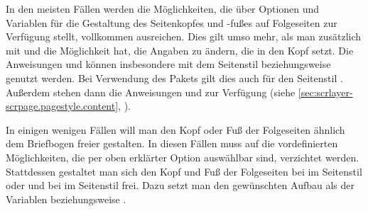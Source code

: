 \begin{Declaration}
\end{Declaration}
In den meisten Fällen werden die Möglichkeiten, die \KOMAScript{} über
Optionen und Variablen für die Gestaltung des Seitenkopfes und
-fußes auf Folgeseiten zur Verfügung stellt,
vollkommen ausreichen.  Dies gilt umso mehr, als man zusätzlich mit
 und  die Möglichkeit hat, die Angaben zu
ändern, die \KOMAScript{} in den Kopf setzt.  Die Anweisungen
 und 
können insbesondere mit dem Seitenstil
%
 beziehungsweise
 genutzt
werden. Bei Verwendung des Pakets%
\hyperref[cha:scrlayer-scrpage]{}%
gilt dies auch für den
Seitenstil %
.  Außerdem stehen dann die Anweisungen
%
 und
%
 zur Verfügung (siehe
\autoref{sec:scrlayer-scrpage.pagestyle.content},
).

\begin{Declaration}
\end{Declaration}
In einigen wenigen Fällen will man den Kopf oder Fuß der Folgeseiten ähnlich
dem Briefbogen freier gestalten. In diesen Fällen muss auf
die vordefinierten Möglichkeiten, die per oben erklärter Option
 auswählbar
sind, verzichtet werden. Stattdessen gestaltet man sich den Kopf und Fuß der
Folgeseiten bei  im Seitenstil
%
 oder
 und bei
 im Seitenstil
%
frei. Dazu setzt man den gewünschten Aufbau als  der
Variablen 
beziehungsweise .

